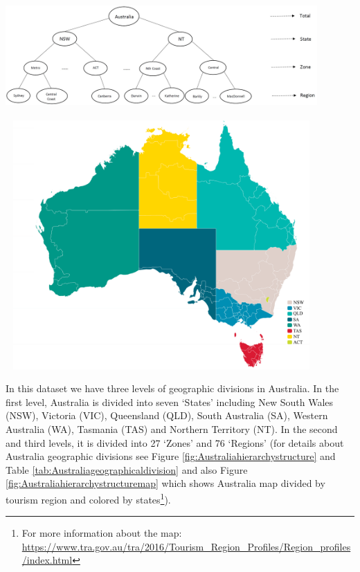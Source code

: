 \documentclass[11pt,a4paper,]{article}
\let\origfigure\figure
\let\endorigfigure\endfigure
\renewenvironment{figure}[1][2] {
    \expandafter\origfigure\expandafter[!htbp]
} {
    \endorigfigure
}
\begin{document}
\begin{figure}

{\centering \includegraphics[width=450px,height=150px]{Paper-Figures/Australian_hierarchy_structure} 

}

\caption{Australian geographic hierarchical structure.}\label{fig:Australiahierarchystructure}
\end{figure}

\begin{figure}

{\centering \includegraphics[width=450px,height=360px]{Paper-Figures/ausTurRegions} 

}

\caption{Australia tourism region map - colors represent states.}\label{fig:Australiahierarchystructuremap}
\end{figure}

In this dataset we have three levels of geographic divisions in
Australia. In the first level, Australia is divided into seven `States'
including New South Wales (NSW), Victoria (VIC), Queensland (QLD), South
Australia (SA), Western Australia (WA), Tasmania (TAS) and Northern
Territory (NT). In the second and third levels, it is divided into 27
`Zones' and 76 `Regions' (for details about Australia geographic
divisions see Figure \ref{fig:Australiahierarchystructure} and Table
\ref{tab:Australiageographicaldivision} and also Figure
\ref{fig:Australiahierarchystructuremap} which shows Australia map
divided by tourism region and colored by states\footnote{For more
  information about the map:
  \url{https://www.tra.gov.au/tra/2016/Tourism_Region_Profiles/Region_profiles/index.html}}).
\end{document}
